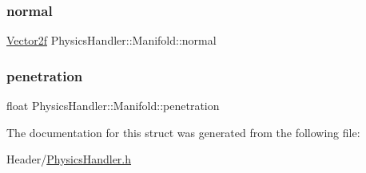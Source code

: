 \subsubsection{\texorpdfstring{normal}{normal}}
{\footnotesize\ttfamily \mbox{\hyperlink{class_vector2f}{Vector2f}} Physics\+Handler\+::\+Manifold\+::normal}

\mbox{\label{struct_physics_handler_1_1_manifold_a877e83b9027793d5e5a580be3d6b79aa}} 
\subsubsection{\texorpdfstring{penetration}{penetration}}
{\footnotesize\ttfamily float Physics\+Handler\+::\+Manifold\+::penetration}



The documentation for this struct was generated from the following file\+:\begin{DoxyCompactItemize}
\item 
Header/\mbox{\hyperlink{_physics_handler_8h}{Physics\+Handler.\+h}}\end{DoxyCompactItemize}
